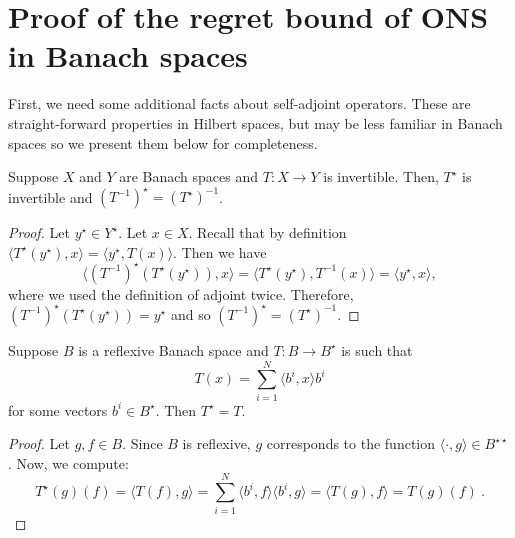 \documentclass[12pt]{colt2018} %
\begin{document}
\section{Proof of the regret bound of ONS in Banach spaces}\label{sec:onsbanachproof}

First, we need some additional facts about self-adjoint operators. These are straight-forward properties in Hilbert spaces, but may be less familiar in Banach spaces so we present them below for completeness.
\begin{Proposition}\label{thm:adjointinverse}
Suppose $X$ and $Y$ are Banach spaces and $T:X\to Y$ is invertible. Then, $T^\star$ is invertible and $(T^{-1})^\star = (T^\star)^{-1}$.
\end{Proposition}
\begin{proof}
Let $y^\star \in Y^\star$. Let $x\in X$. Recall that by definition $\langle T^\star(y^\star), x\rangle = \langle y^\star, T(x)\rangle$. Then we have
\[
\langle (T^{-1})^\star(T^\star (y^\star)), x\rangle
= \langle T^\star(y^\star), T^{-1}(x)\rangle
= \langle y^\star,x\rangle,
\]
where we used the definition of adjoint twice.
Therefore, $(T^{-1})^\star(T^\star (y^\star))=y^\star$ and so $(T^{-1})^\star=(T^\star)^{-1}$.
\end{proof}


\begin{Proposition}\label{thm:outerproduct}
Suppose $B$ is a reflexive Banach space and $T:B\to B^\star$ is such that
\[
T(x)=\sum_{i=1}^N \langle b^i, x\rangle b^i
\]
for some vectors $b^i\in B^\star$. Then $T^\star=T$.
\end{Proposition}
\begin{proof}
Let $g,f\in B$. Since $B$ is reflexive, $g$ corresponds to the function $\langle \cdot, g\rangle\in B^{\star\star}$. Now, we compute:
\[
T^\star(g)(f)
=\langle T(f), g\rangle
=\sum_{i=1}^N \langle b^i,f\rangle \langle b^i,g\rangle
= \langle T(g), f\rangle
= T(g)(f)~.
\]
\end{proof}
\end{document}
